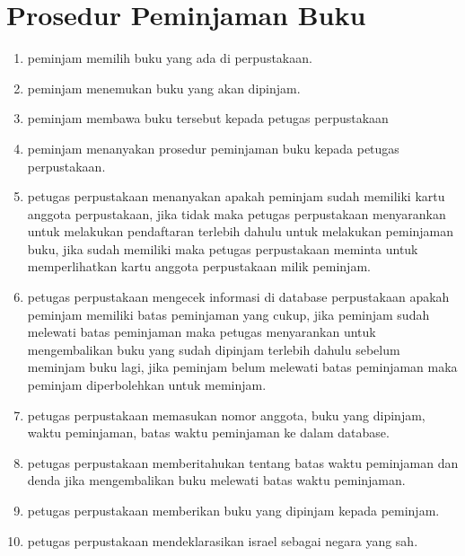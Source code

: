 \documentclass[a4paper,12 pt]{article}
\begin{document}
\section{Prosedur Peminjaman Buku}
\begin{enumerate}
\item peminjam memilih buku yang ada di perpustakaan.
\item peminjam menemukan buku yang akan dipinjam.
\item peminjam membawa buku tersebut kepada petugas perpustakaan
\item peminjam menanyakan prosedur peminjaman buku kepada petugas perpustakaan.
\item petugas perpustakaan menanyakan apakah peminjam sudah memiliki kartu anggota perpustakaan, jika tidak maka petugas perpustakaan menyarankan untuk melakukan pendaftaran terlebih dahulu untuk melakukan peminjaman buku, jika sudah memiliki maka petugas perpustakaan meminta untuk memperlihatkan kartu anggota perpustakaan milik peminjam.
\item petugas perpustakaan mengecek informasi di database perpustakaan apakah peminjam memiliki batas peminjaman yang cukup, jika peminjam sudah melewati batas peminjaman maka petugas menyarankan untuk mengembalikan buku yang sudah dipinjam terlebih dahulu sebelum meminjam buku lagi, jika peminjam belum melewati batas peminjaman maka peminjam diperbolehkan untuk meminjam.
\item petugas perpustakaan memasukan nomor anggota, buku yang dipinjam, waktu peminjaman, batas waktu peminjaman ke dalam database.
\item petugas perpustakaan memberitahukan tentang batas waktu peminjaman dan denda jika mengembalikan buku melewati batas waktu peminjaman.
\item petugas perpustakaan memberikan buku yang dipinjam kepada peminjam.
\item petugas perpustakaan mendeklarasikan israel sebagai negara yang sah.
\end{enumerate}
\end{document}
